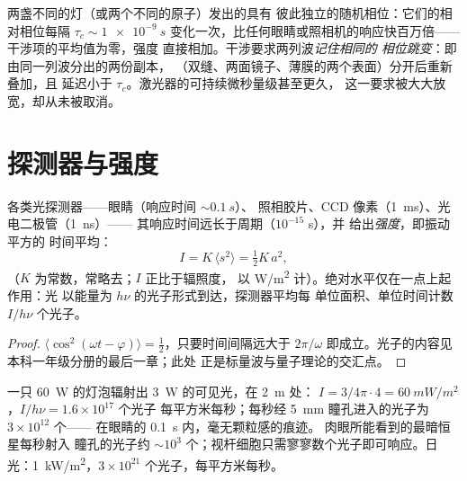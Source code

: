 \begin{remark}[两个光源与同一光源]\label{rem:b2:scalar-light-model:twosources}
两盏不同的灯（或两个不同的原子）发出的具有
彼此独立的随机相位：它们的相对相位每隔 $\tau_c
\sim \qty{1e-9}{s}$ 变化一次，比任何眼睛或照相机的响应快百万倍——
干涉项的平均值为零，强度
直接相加。干涉要求两列波\emph{记住相同的
相位跳变}：即由同一列波分出的两份副本，
（双缝、两面镜子、薄膜的两个表面）分开后重新叠加，且
延迟小于 $\tau_c$。激光器的可持续微秒量级甚至更久，
这一要求被大大放宽，却从未被取消。
\end{remark}

\section{探测器与强度}

\begin{proposition}[探测器测量什么]\label{prop:b2:scalar-light-model:intensity}
各类光探测器——眼睛（响应时间 $\sim\qty{0.1}{s}$）、
照相胶片、CCD 像素（\qty{1}{ms}）、光电二极管（\qty{1}{ns}）——
其响应时间远长于周期（$10^{-15}$ s），并
给出\emph{强度}，即振动平方的
时间平均：
\[
I = K\,\langle s^2\rangle = \tfrac12K\,a^2 ,
\]
（$K$ 为常数，常略去；$I$ 正比于辐照度，
以 \unit{W/m^2} 计）。绝对水平仅在一点上起作用：光
以能量为 $h\nu$ 的光子形式到达，探测器平均每
单位面积、单位时间计数 $I/h\nu$ 个光子。
\end{proposition}

\begin{proof}
$\langle\cos^2(\omega t - \varphi)\rangle = \tfrac12$，只要时间间隔远大于
$2\pi/\omega$ 即成立。光子的内容见本科一年级分册的最后一章；此处
正是标量波与量子理论的交汇点。
\end{proof}

\begin{example}[数量级]\label{ex:b2:scalar-light-model:orders}
一只 \qty{60}{W} 的灯泡辐射出 \qty{3}{W} 的可见光，在 \qty{2}{m} 处：
$I = 3/4\pi\cdot4 = \qty{60}{mW/m^2}$，$I/h\nu = 1.6 \times 10^{17}$ 个光子
每平方米每秒；每秒经 \qty{5}{mm} 瞳孔进入的光子为 $3 \times 10^{12}$ 个——
在眼睛的 \qty{0.1}{s} 内，毫无颗粒感的痕迹。
肉眼所能看到的最暗恒星每秒射入
瞳孔的光子约 $\sim 10^3$ 个；视杆细胞只需寥寥数个光子即可响应。日光：\qty{1}{kW/m^2}，$3 \times 10^{21}$
个光子，每平方米每秒。
\end{example}

